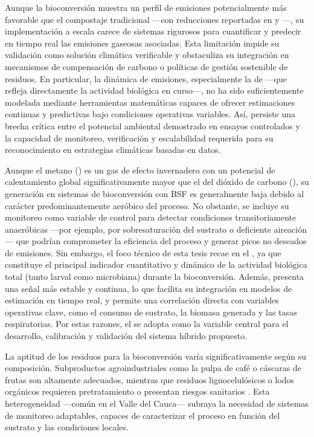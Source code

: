 Aunque la bioconversión muestra un perfil de emisiones potencialmente más favorable que el compostaje tradicional ---con reducciones reportadas en  y  \cite{jenkinsProcessingPoultryManure2025}---, su implementación a escala carece de sistemas rigurosos para cuantificar y predecir en tiempo real las emisiones gaseosas asociadas. Esta limitación impide su validación como solución climática verificable y obstaculiza su integración en mecanismos de compensación de carbono o políticas de gestión sostenible de residuos. En particular, la dinámica de emisiones, especialmente la de  ---que refleja directamente la actividad biológica en curso---, no ha sido suficientemente modelada mediante herramientas matemáticas capaces de ofrecer estimaciones continuas y predictivas bajo condiciones operativas variables. Así, persiste una brecha crítica entre el potencial ambiental demostrado en ensayos controlados y la capacidad de monitoreo, verificación y escalabilidad requerida para su reconocimiento en estrategias climáticas basadas en datos.

Aunque el metano () es un gas de efecto invernadero con un potencial de calentamiento global significativamente mayor que el del dióxido de carbono (), su generación en sistemas de bioconversión con BSF es generalmente baja debido al carácter predominantemente aeróbico del proceso. No obstante, se incluye su monitoreo como variable de control para detectar condiciones transitoriamente anaeróbicas ---por ejemplo, por sobresaturación del sustrato o deficiente aireación--- que podrían comprometer la eficiencia del proceso y generar picos no deseados de emisiones. Sin embargo, el foco técnico de esta tesis recae en el , ya que constituye el principal indicador cuantitativo y dinámico de la actividad biológica total (tanto larval como microbiana) durante la bioconversión. Además, presenta una señal más estable y continua, lo que facilita su integración en modelos de estimación en tiempo real, y permite una correlación directa con variables operativas clave, como el consumo de sustrato, la biomasa generada y las tasas respiratorias. Por estas razones, el  se adopta como la variable central para el desarrollo, calibración y validación del sistema híbrido propuesto.

La aptitud de los residuos para la bioconversión varía significativamente según su composición. Subproductos agroindustriales como la pulpa de café o cáscaras de frutas son altamente adecuados, mientras que residuos lignocelulósicos o lodos orgánicos requieren pretratamiento o presentan riesgos sanitarios \cite{brunoValorizationOrganicWaste2025, elsayedConversionProteinrichWaste2024a}. Esta heterogeneidad ---común en el Valle del Cauca--- subraya la necesidad de sistemas de monitoreo adaptables, capaces de caracterizar el proceso en función del sustrato y las condiciones locales.

